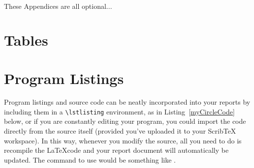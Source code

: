 \documentclass[11pt, a4paper]{article}
\begin{document}
%


  



\newpage
\appendix
\appendixpage
\addappheadtotoc

These Appendices are all optional...

\section{Tables}


\section{Program Listings}

Program listings and source code can be neatly incorporated into your reports by including them in a \verb|\lstlisting| environment, as in Listing~\ref{myCircleCode} below, or if you are constantly editing your program, you could import the code directly from the source itself (provided you've uploaded it to your ScribTeX workspace). In this way, whenever you modify the source, all you need to do is recompile the \LaTeX code and your report document will automatically be updated. The command to use would be something like \verb||.
\end{document}
